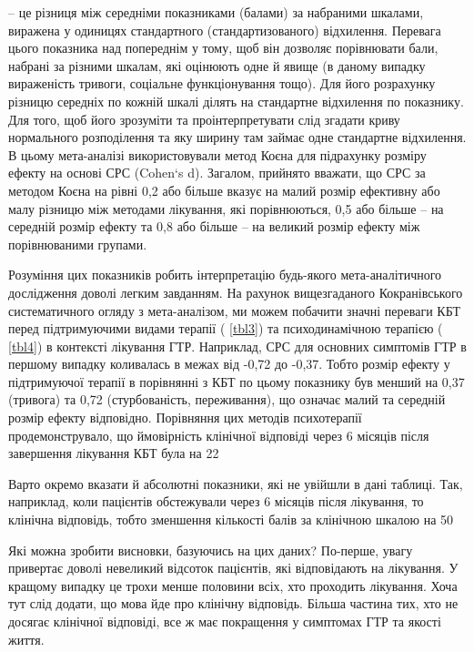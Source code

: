                   
 – це різниця між середніми показниками (балами) за набраними шкалами, виражена у одиницях стандартного (стандартизованого) відхилення. Перевага цього показника над попереднім у тому, щоб він дозволяє порівнювати бали, набрані за різними шкалам, які оцінюють одне й явище (в даному випадку вираженість тривоги, соціальне функціонування тощо). Для його розрахунку різницю середніх по кожній шкалі ділять на стандартне відхилення по показнику. Для того, щоб його зрозуміти та проінтерпретувати слід згадати криву нормального розподілення та яку ширину там займає одне стандартне відхилення. В цьому мета-аналізі використовували метод Коєна для підрахунку розміру ефекту на основі СРС (Cohen`s d). Загалом, прийнято вважати, що СРС за методом Коєна на рівні 0,2 або більше вказує на малий розмір ефективну або малу різницю між методами лікування, які порівнюються, 0,5 або більше – на середній розмір ефекту та 0,8 або більше – на великий розмір ефекту між порівнюваними групами.

Розуміння цих показників робить інтерпретацію будь-якого мета-аналітичного дослідження доволі легким завданням. На рахунок вищезгаданого Кокранівського систематичного огляду з мета-аналізом, ми можем побачити значні переваги КБТ перед підтримуючими видами терапії (
\ref{tbl3}) та психодинамічною терапією (
\ref{tbl4}) в контексті лікування ГТР. Наприклад, СРС для основних симптомів ГТР в першому випадку коливалась в межах від -0,72 до -0,37. Тобто розмір ефекту у підтримуючої терапії в порівнянні з КБТ по цьому показнику був менший на 0,37 (тривога) та  0,72 (стурбованість, переживання), що означає малий та середній розмір ефекту відповідно. Порівняння цих методів психотерапії продемонструвало, що ймовірність клінічної відповіді через 6 місяців після завершення лікування КБТ була на 22%

Варто окремо вказати й абсолютні показники, які не увійшли в дані таблиці. Так, наприклад, коли пацієнтів обстежували через 6 місяців після лікування, то клінічна відповідь, тобто зменшення кількості балів за клінічною шкалою на 50%

Які можна зробити висновки, базуючись на цих даних? По-перше, увагу привертає доволі невеликий відсоток пацієнтів, які відповідають на лікування. У кращому випадку це трохи менше половини всіх, хто проходить лікування. Хоча тут слід додати, що мова йде про клінічну відповідь. Більша частина тих, хто не досягає клінічної відповіді, все ж має покращення у симптомах ГТР та якості життя.

